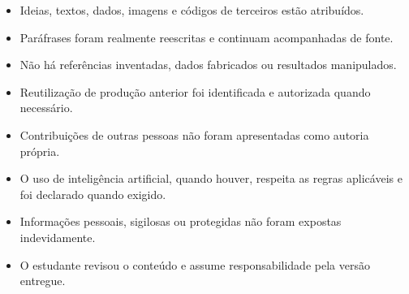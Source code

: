 \begin{itemize}
  \item Ideias, textos, dados, imagens e códigos de terceiros estão atribuídos.
  \item Paráfrases foram realmente reescritas e continuam acompanhadas de fonte.
  \item Não há referências inventadas, dados fabricados ou resultados manipulados.
  \item Reutilização de produção anterior foi identificada e autorizada quando necessário.
  \item Contribuições de outras pessoas não foram apresentadas como autoria própria.
  \item O uso de inteligência artificial, quando houver, respeita as regras aplicáveis e foi declarado quando exigido.
  \item Informações pessoais, sigilosas ou protegidas não foram expostas indevidamente.
  \item O estudante revisou o conteúdo e assume responsabilidade pela versão entregue.
\end{itemize}
